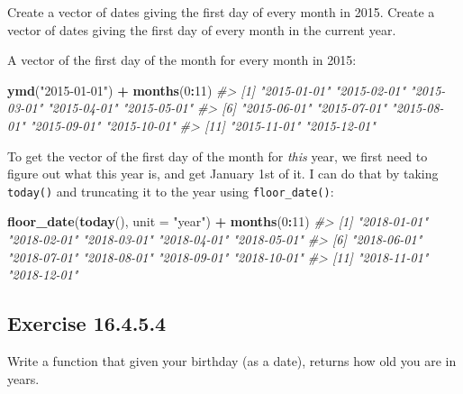 \documentclass[]{book}
\newenvironment{Shaded}{\begin{snugshade}}{\end{snugshade}}
\newcommand{\CommentTok}[1]{\textcolor[rgb]{0.56,0.35,0.01}{\textit{#1}}}
\newcommand{\ControlFlowTok}[1]{\textcolor[rgb]{0.13,0.29,0.53}{\textbf{#1}}}
\newcommand{\DataTypeTok}[1]{\textcolor[rgb]{0.13,0.29,0.53}{#1}}
\newcommand{\DecValTok}[1]{\textcolor[rgb]{0.00,0.00,0.81}{#1}}
\newcommand{\KeywordTok}[1]{\textcolor[rgb]{0.13,0.29,0.53}{\textbf{#1}}}
\newcommand{\NormalTok}[1]{#1}
\newcommand{\OperatorTok}[1]{\textcolor[rgb]{0.81,0.36,0.00}{\textbf{#1}}}
\newcommand{\StringTok}[1]{\textcolor[rgb]{0.31,0.60,0.02}{#1}}
\theoremstyle{plain}
\theoremstyle{remark}
\begin{document}
Create a vector of dates giving the first day of every month in 2015.
Create a vector of dates giving the first day of every month in the
current year.

A vector of the first day of the month for every month in 2015:

\begin{Shaded}
\begin{Highlighting}[]
\KeywordTok{ymd}\NormalTok{(}\StringTok{"2015-01-01"}\NormalTok{) }\OperatorTok{+}\StringTok{ }\KeywordTok{months}\NormalTok{(}\DecValTok{0}\OperatorTok{:}\DecValTok{11}\NormalTok{)}
\CommentTok{#>  [1] "2015-01-01" "2015-02-01" "2015-03-01" "2015-04-01" "2015-05-01"}
\CommentTok{#>  [6] "2015-06-01" "2015-07-01" "2015-08-01" "2015-09-01" "2015-10-01"}
\CommentTok{#> [11] "2015-11-01" "2015-12-01"}
\end{Highlighting}
\end{Shaded}

To get the vector of the first day of the month for \emph{this} year, we
first need to figure out what this year is, and get January 1st of it. I
can do that by taking \texttt{today()} and truncating it to the year
using \texttt{floor\_date()}:

\begin{Shaded}
\begin{Highlighting}[]
\KeywordTok{floor_date}\NormalTok{(}\KeywordTok{today}\NormalTok{(), }\DataTypeTok{unit =} \StringTok{"year"}\NormalTok{) }\OperatorTok{+}\StringTok{ }\KeywordTok{months}\NormalTok{(}\DecValTok{0}\OperatorTok{:}\DecValTok{11}\NormalTok{)}
\CommentTok{#>  [1] "2018-01-01" "2018-02-01" "2018-03-01" "2018-04-01" "2018-05-01"}
\CommentTok{#>  [6] "2018-06-01" "2018-07-01" "2018-08-01" "2018-09-01" "2018-10-01"}
\CommentTok{#> [11] "2018-11-01" "2018-12-01"}
\end{Highlighting}
\end{Shaded}

\hypertarget{exercise-16.4.5.4}{%
\subsection*{\texorpdfstring{Exercise
{16.4.5.4}}{Exercise 16.4.5.4}}\label{exercise-16.4.5.4}}

Write a function that given your birthday (as a date), returns how old
you are in years.

\begin{Shaded}
\end{Shaded}
\end{document}
